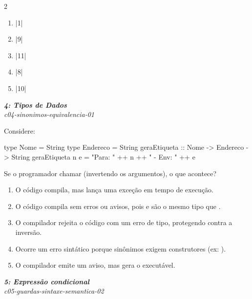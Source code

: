 \documentclass[a4paper,10pt,brazil]{article}
\begin{document}
\begin{multicols}{2}
\begin{enumerate}
  \item \haskellinline|1|

  \item \haskellinline|9|

  \item \haskellinline|11|

  \item \haskellinline|8|

  \item \haskellinline|10|


\end{enumerate}

\begin{flushright}
  \footnotesize
  \textit{\textbf{4: Tipos de Dados}}\\
  \textit{c04-sinonimos-equivalencia-01}\\

\end{flushright}
Considere:
\begin{haskellcode}
type Nome = String
type Endereco = String
geraEtiqueta :: Nome -> Endereco -> String
geraEtiqueta n e = "Para: " ++ n ++ " - Env: " ++ e
\end{haskellcode}
Se o programador chamar  (invertendo os argumentos), o que acontece?

\begin{enumerate}
  \item O código compila, mas lança uma exceção em tempo de execução.

  \item O código compila sem erros ou avisos, pois  e  são o mesmo tipo que .

  \item O compilador rejeita o código com um erro de tipo, protegendo contra a inversão.

  \item Ocorre um erro sintático porque sinônimos exigem construtores (ex: ).

  \item O compilador emite um aviso, mas gera o executável.


\end{enumerate}

\begin{flushright}
  \footnotesize
  \textit{\textbf{5: Expressão condicional}}\\
  \textit{c05-guardas-sintaxe-semantica-02}\\


\end{flushright}
\end{multicols}
\end{document}
